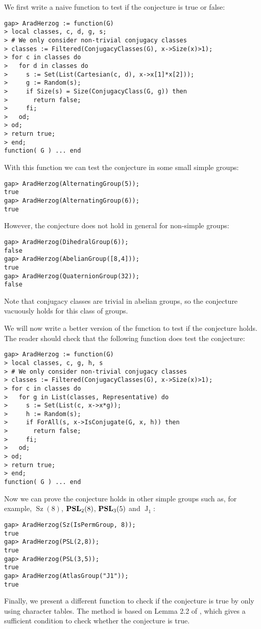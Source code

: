 \begin{example}
We first write a naive function to test if the 
conjecture is true or false:
\begin{lstlisting}
gap> AradHerzog := function(G)
> local classes, c, d, g, s;
> # We only consider non-trivial conjugacy classes
> classes := Filtered(ConjugacyClasses(G), x->Size(x)>1);
> for c in classes do
>   for d in classes do
>     s := Set(List(Cartesian(c, d), x->x[1]*x[2]));
>     g := Random(s);
>     if Size(s) = Size(ConjugacyClass(G, g)) then
>       return false;
>     fi;
>   od;
> od;
> return true;
> end;
function( G ) ... end
\end{lstlisting}
With this function we can test the conjecture
in some small simple groups:
\begin{lstlisting}
gap> AradHerzog(AlternatingGroup(5));
true
gap> AradHerzog(AlternatingGroup(6));
true
\end{lstlisting}
However, the conjecture does not hold in general for non-simple groups:
\begin{lstlisting}
gap> AradHerzog(DihedralGroup(6));
false
gap> AradHerzog(AbelianGroup([8,4]));
true
gap> AradHerzog(QuaternionGroup(32));
false
\end{lstlisting}
Note that conjugacy classes are trivial in abelian groups, so the conjecture vacuously holds for this class of groups.

We will now write a better version of 
the function to test if the conjecture holds. The reader
should check that the following function 
does test the conjecture:
\begin{lstlisting}
gap> AradHerzog := function(G)
> local classes, c, g, h, s
> # We only consider non-trivial conjugacy classes
> classes := Filtered(ConjugacyClasses(G), x->Size(x)>1);
> for c in classes do
>   for g in List(classes, Representative) do
>     s := Set(List(c, x->x*g));
>     h := Random(s);
>     if ForAll(s, x->IsConjugate(G, x, h)) then
>       return false;
>     fi;
>   od;
> od;
> return true;
> end;
function( G ) ... end
\end{lstlisting}
Now we can prove the conjecture holds
in other simple groups such as, for example, 
$\operatorname{Sz}(8)$, 
$\mathbf{PSL}_2(8)$, $\mathbf{PSL}_3(5)$ and $\operatorname{J}_1$:
\begin{lstlisting}
gap> AradHerzog(Sz(IsPermGroup, 8));
true
gap> AradHerzog(PSL(2,8));
true
gap> AradHerzog(PSL(3,5));
true
gap> AradHerzog(AtlasGroup("J1"));
true
\end{lstlisting}
Finally, we present a different function to check if the conjecture is true by only
using character tables. 
The method is based on Lemma 2.2 of \cite{MR3003939}, which gives
a sufficient condition to check whether the conjecture is true. 


\end{example}
